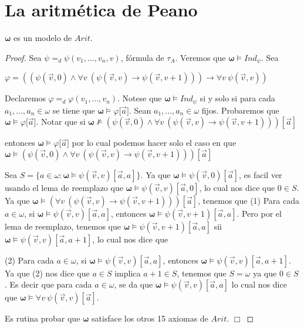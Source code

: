 \section{La aritmética de Peano}

  \begin{lemma} \label{lemma_91}
    \PN $\mathbf{\omega}$ es un modelo de $Arit$.
  \end{lemma}
  \begin{proof}
    Sea $\psi =_{d}\psi (v_{1},...,v_{n},v)$, f\'{o}rmula de $\tau _{A}$. Veremos que $\mathbf{\omega }\vDash Ind_{\psi }$. Sea

    $\displaystyle \varphi =((\psi (\vec{v},0)\wedge \forall v\ (\psi (\vec{v},v)\rightarrow \psi (\vec{v},v+1)))\rightarrow \forall v\ \psi (\vec{v},v)) $

    Declaremos $\varphi =_{d}\varphi (v_{1},...,v_{n})$. Notese que $\mathbf{ \omega }\vDash Ind_{\psi }$ si y solo si para cada $a_{1},...,a_{n}\in \omega $ se tiene que $\mathbf{\omega }\vDash \varphi \lbrack \vec{a}]$. Sean $a_{1},...,a_{n}\in \omega $ fijos. Probaremos que $\mathbf{\omega } \vDash \varphi \lbrack \vec{a}]$. Notar que si
    $\displaystyle \mathbf{\omega }\nvDash (\psi (\vec{v},0)\wedge \forall v\ (\psi (\vec{v} ,v)\rightarrow \psi (\vec{v},v+1)))[\vec{a}] $

    entonces $\mathbf{\omega }\vDash \varphi \lbrack \vec{a}]$ por lo cual podemos hacer solo el caso en que
    $\displaystyle \mathbf{\omega }\vDash (\psi (\vec{v},0)\wedge \forall v\ (\psi (\vec{v} ,v)\rightarrow \psi (\vec{v},v+1)))[\vec{a}] $

    Sea $S=\{a\in \omega :\mathbf{\omega }\vDash \psi (\vec{v},v)[\vec{a},a]\}$. Ya que $\mathbf{\omega }\vDash \psi (\vec{v},0)[\vec{a}]$, es facil ver usando el lema de reemplazo que $\mathbf{\omega }\vDash \psi (\vec{v},v)[ \vec{a},0]$, lo cual nos dice que $0\in S$. Ya que $\mathbf{\omega }\vDash (\forall v\ (\psi (\vec{v},v)\rightarrow \psi (\vec{v},v+1)))[\vec{a}]$, tenemos que
    (1) Para cada $a\in \omega $, si $\mathbf{\omega }\vDash \psi (\vec{v} ,v)[\vec{a},a]$, entonces $\mathbf{\omega }\vDash \psi (\vec{v},v+1)[\vec{a} ,a]$.
    Pero por el lema de reemplazo, tenemos que $\mathbf{\omega }\vDash \psi ( \vec{v},v+1)[\vec{a},a]$ sii $\mathbf{\omega }\vDash \psi (\vec{v},v)[\vec{a} ,a+1]$, lo cual nos dice que

    (2) Para cada $a\in \omega $, si $\mathbf{\omega }\vDash \psi (\vec{v} ,v)[\vec{a},a]$, entonces $\mathbf{\omega }\vDash \psi (\vec{v},v)[\vec{a} ,a+1]$.
    Ya que (2) nos dice que $a\in S$ implica $a+1\in S$, tenemos que $S=\omega $ ya que $0\in S$. Es decir que para cada $a\in \omega $, se da que $\mathbf{ \omega }\vDash \psi (\vec{v},v)[\vec{a},a]$ lo cual nos dice que $\mathbf{ \omega }\vDash \forall v\ \psi (\vec{v},v)[\vec{a}]$.

    Es rutina probar que $\mathbf{\omega }$ satisface los otros 15 axiomas de $ Arit$. $\Box$
  \end{proof}

